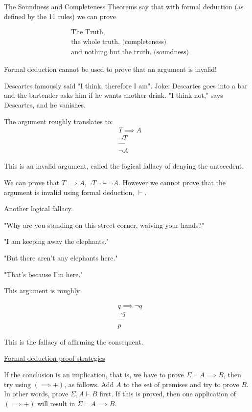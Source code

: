 \documentclass{article}
\begin{document}
The Soundness and Completeness Theorems say that with formal deduction (as defined by the 11 rules) we can prove 

\begin{align*}
&\text{The Truth,} \\
&\text{the whole truth, (completeness)} \\
&\text{and nothing but the truth. (soundness)}
\end{align*}

Formal deduction cannot be used to prove that an argument is invalid!

Descartes famously said "I think, therefore I am". Joke: Descartes goes into a bar and the bartender asks him if he wants another drink. "I think not," says Descartes, and he vanishes. 

The argument roughly translates to:
\begin{align*}
&T \implies A \\
&\neg T \\
&\text{---} \\
&\neg A
\end{align*}

This is an invalid argument, called the logical fallacy of denying the antecedent. 

We can prove that $T \implies A, \neg T \neg\vDash \neg A$. However we cannot prove that the argument is invalid using formal deduction, $\vdash$.

Another logical fallacy. 

"Why are you standing on this street corner, waiving your hands?"

"I am keeping away the elephants."

"But there aren't any elephants here."

"That's because I'm here."

This argument is roughly

\begin{align*}
&q \implies \neg q \\
&\neg q \\
&\text{---} \\
&p
\end{align*}

This is the fallacy of affirming the consequent.

\underline{Formal deduction proof strategies}

If the conclusion is an implication, that is, we have to prove $\Sigma \vdash A \implies B$, then try using $(\implies +)$, as follows. Add $A$ to the set of premises and try to prove $B$. In other words, prove $\Sigma, A \vdash B$ first. If this is proved, then one application of $(\implies +)$ will result in $\Sigma \vdash A \implies B$.
\end{document}
